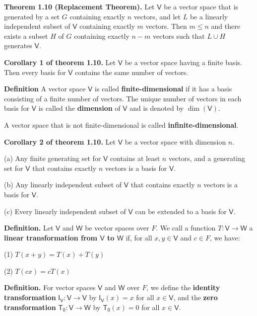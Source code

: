 \documentclass{article}
\newcommand{\0}{\mathit{0}}
\begin{document}
\textbf{Theorem 1.10 (Replacement Theorem).}
Let $\mathsf{V}$ be a vector space that is generated by a set $G$ containing
exactly $n$ vectors, and let $L$ be a linearly independent subset of
$\mathsf{V}$ containing exactly $m$ vectors. Then $m \leq n$ and there
exists a subset $H$ of $G$ containing exactly $n - m$ vectors such that
$L \cup H$ generates $\mathsf{V}$.

\medskip

\textbf{Corollary 1 of theorem 1.10.} Let $\mathsf{V}$ be a vector space having a finite basis.
Then every basis for $\mathsf{V}$ contains the same number of vectors.

\medskip

\textbf{Definition}
A vector space $\mathsf{V}$ is called \textbf{finite-dimensional} if it has a basis
consisting of a finite number of vectors. The unique number of vectors in each
basis for $\mathsf{V}$ is called the \textbf{dimension} of $\mathsf{V}$ and is denoted
by $\dim(\mathsf{V})$.

A vector space that is not finite-dimensional is called \textbf{infinite-dimensional}.

\medskip

\textbf{Corollary 2 of theorem 1.10.} Let $\mathsf{V}$ be a vector space with dimension $n$.

(a) Any finite generating set for $\mathsf{V}$ contains at least $n$ vectors,
and a generating set for $\mathsf{V}$ that contains exactly $n$ vectors
is a basis for $\mathsf{V}$.

(b) Any linearly independent subset of $\mathsf{V}$ that contains exactly
$n$ vectors is a basis for $\mathsf{V}$.

(c) Every linearly independent subset of $\mathsf{V}$ can be extended to
a basis for $\mathsf{V}$.

\medskip

\textbf{Definition.}
Let $\mathsf{V}$ and $\mathsf{W}$ be vector spaces over $F$. We call a function
$T: \mathsf{V} \to \mathsf{W}$ a \textbf{linear transformation from $\mathsf{V}$ to $\mathsf{W}$} if,
for all $x, y \in \mathsf{V}$ and $c \in F$, we have:

(1) $T(x + y) = T(x) + T(y)$

(2) $T(cx) = cT(x)$

\medskip

\textbf{Definition.} For vector spaces $\mathsf{V}$ and $\mathsf{W}$ over $F$, we define the
\textbf{identity transformation} $\mathsf{I_V}: \mathsf{V} \to \mathsf{V}$
by $\mathsf{I_V}(x) = x$ for all $x \in \mathsf{V}$,
and the \textbf{zero transformation} $\mathsf{T_0}: \mathsf{V} \to \mathsf{W}$
by $\mathsf{T_0}(x) = \0$ for all $x \in \mathsf{V}$.
\end{document}

